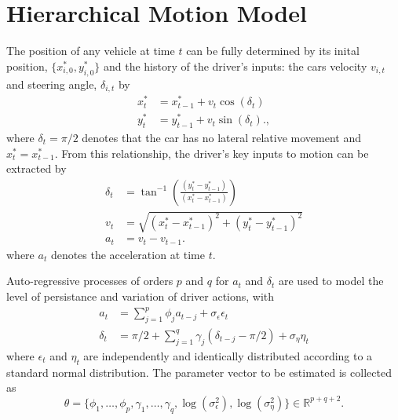 \documentclass[12pt,a4paper]{article}\usepackage[]{graphicx}\usepackage[]{color}
\begin{document}
\section{Hierarchical Motion Model}

The position of any vehicle at time $t$ can be fully determined by its inital position, $\{x^*_{i, 0}, y^*_{i, 0}\}$ and the history of the driver's inputs: the cars velocity $v_{i, t}$ and steering angle, $\delta_{i, t}$ by
\begin{align}
x^*_{t} &= x^*_{t-1} + v_{t} \cos(\delta_{t}) \label{xEq} \\
y^*_{t} &= y^*_{t-1} + v_{t} \sin(\delta_{t}). \label{yEq},
\end{align}
where $\delta_{t} = \pi/2$ denotes that the car has no lateral relative movement and $x^*_{t} = x^*_{t-1}$.
From this relationship, the driver's key inputs to motion can be extracted by
\begin{align}
\delta_{t} &= \tan^{-1}\left(\frac{(y^*_{t} - y^*_{t-1})}{(x^*_{t} - x^*_{t-1})} \right) \label{dEq} \\
v_{t} &= \sqrt{(x^*_{t} - x^*_{t-1})^2 + (y^*_{t} - y^*_{t-1})^2} \label{vEq} \\
a_{t} &= v_{t} - v_{t-1}. \label{aEq}
\end{align}
where $a_{t}$ denotes the acceleration at time $t$.

Auto-regressive processes of orders $p$ and $q$ for $a_t$ and  $\delta_t$ are used to model the level of persistance and variation of driver actions, with
\begin{align}
a_{t} &= \sum_{j = 1}^p \phi_{j} a_{t-j} + \sigma_{\epsilon} \epsilon_{t} \label{aAR} \\
\delta_{t} &= \pi/2 + \sum_{j = 1}^q \gamma_{j} (\delta_{t-j} - \pi/2) + \sigma_{\eta} \eta_{t} \label{dAR}
\end{align}
where $\epsilon_{t}$ and $\eta_t$ are independently and identically distributed according to a standard normal distribution. The parameter vector to be estimated is collected as 
\begin{equation*}
\label{thetaVec}
\theta = \{\phi_{1}, \dots, \phi_{p}, \gamma_{1}, \dots, \gamma_{q}, \log(\sigma^{2}_{\epsilon}), \log(\sigma^{2}_{\eta})\} \in \mathbb{R}^{p + q + 2}.
\end{equation*}
\end{document}
